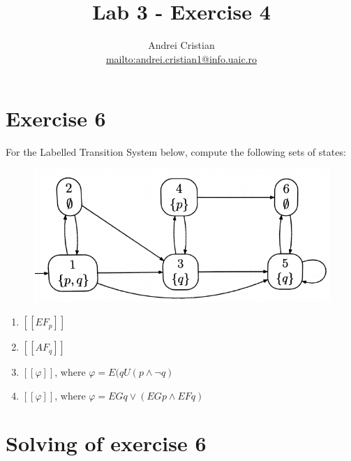 \documentclass[10pt,a4paper]{article}
\author{Andrei Cristian\\\url{mailto:andrei.cristian1@info.uaic.ro}}
\title{Lab 3 - Exercise 4}
\begin{document}
\newcommand{\llbracket}{[\![}
\newcommand{\rrbracket}{]\!]}
\maketitle
\section{Exercise 6}
For the Labelled Transition System below, compute the following sets of states:

\begin{figure}[ht]
\centering
\includegraphics[scale=0.6]{ex4_labelled_transition_system.png}
\end{figure}

\begin{enumerate}
\item $\llbracket EF_p \rrbracket$
\item $\llbracket AF_q \rrbracket$
\item $\llbracket \varphi \rrbracket$, where $\varphi = E( qU (p \wedge \neg q )$
\item $\llbracket \varphi \rrbracket$, where $\varphi = EGq \vee ( EGp \wedge EFq )$
\end{enumerate}

\section{Solving of exercise 6}
\end{document}
